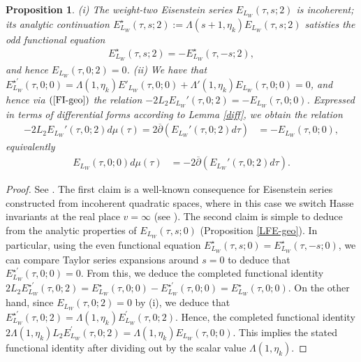 \documentclass{amsart}
\newtheorem{proposition}[theorem]{Proposition}
\theoremstyle{definition}
\theoremstyle{definition}
\theoremstyle{definition}
\begin{document}
\begin{proposition}\label{vanishing} (i) The weight-two Eisenstein series $E_{L_W}(\tau, s; 2)$ is incoherent; its analytic continuation
$E^{\star}_{L_W}(\tau, s; 2) := \Lambda(s+1, \eta_k) E_{L_W}(\tau, s; 2)$ satisties the odd functional equation 
\begin{align*} E^{\star}_{L_W}(\tau, s; 2) = - E_{L_W}^{\star}(\tau, -s;2), \end{align*}
and hence $E_{L_W}(\tau, 0; 2) = 0$.  (ii) We have that $E_{L_W}^{\star \prime}(\tau, 0;0) = \Lambda(1, \eta_k) E'_{L_W}(\tau, 0; 0) + \Lambda'(1, \eta_k) E_{L_W}(\tau, 0; 0) =0$, 
and hence via $(\ref{FI-geo})$ the relation $-2 L_2 E_{L_W}'(\tau, 0; 2) =-  E_{L_W}(\tau, 0; 0)$.
Expressed in terms of differential forms according to Lemma \ref{diff}, we obtain the relation 
\begin{align*} - 2 L_2 E_{L_W}'(\tau, 0; 2) d \mu(\tau) = 2 \overline{\partial} \left( E_{L_W}'(\tau, 0; 2) d\tau \right) &= - E_{L_W}(\tau, 0; 0),\end{align*} 
equivalently 
\begin{align}\label{FI-geo3} E_{L_W}(\tau, 0; 0) d \mu(\tau) 
&= - 2 \overline{\partial} \left( E_{L_W}'(\tau, 0; 2) d \tau\right). \end{align}

 \end{proposition}

\begin{proof} See \cite[Propositions 4.10 and 4.12]{VO}. The first claim is a well-known consequence for Eisenstein series constructed 
from incoherent quadratic spaces, where in this case we switch Hasse invariants at the real place $v=\infty$ (see \cite[Definition 2.1]{KuEis}). 
The second claim is simple to deduce from the analytic properties of $E_{L_W}(\tau, s; 0)$ (Proposition \ref{LFE-geo}).
In particular, using the even functional equation $E_{L_W}^{\star}(\tau, s; 0) = E^{\star}_{L_W}(\tau, -s;0)$, we can compare Taylor series expansions around $s=0$
to deduce that $E_{L_W}^{\star \prime}(\tau, 0;0) =0$. From this, we deduce the completed functional identity 
$2 L_2 E_{L_W}^{\star \prime}(\tau, 0; 2) =  E^{\star}_{L_W}(\tau, 0;0) - E^{\star \prime}_{L_W}(\tau, 0; 0) = E^{\star}_{L_W}(\tau, 0;0)$.
On the other hand, since $E_{L_W}(\tau, 0; 2) = 0$ by (i), we deduce that $E_{L_W}^{\star \prime}(\tau, 0;2) = \Lambda(1, \eta_k)E_{L_W}^{\prime}(\tau, 0; 2)$.
Hence, the completed functional identity $2 \Lambda(1, \eta_k) L_2 E_{L_W}^{\prime}(\tau, 0; 2) = \Lambda(1, \eta_k) E_{L_W}(\tau, 0; 0)$. This implies
the stated functional identity after dividing out by the scalar value $\Lambda(1, \eta_k)$. \end{proof}
\end{document}
